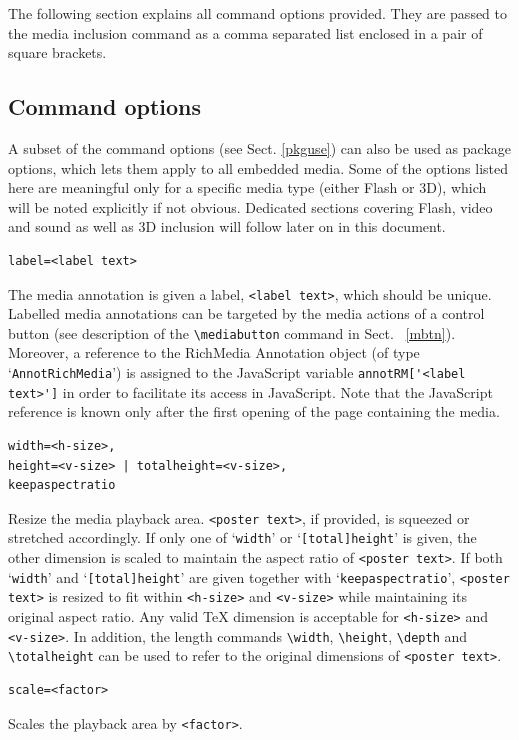 \documentclass[a4paper]{article}
\begin{document}
The following section explains all command options provided. They are passed to the media inclusion command as a comma separated list enclosed in a pair of square brackets.

\subsection{Command options}
A subset of the command options (see Sect. \ref{pkguse}) can also be used as package options, which lets them apply to all embedded media. Some of the options listed here are meaningful only for a specific media type (either Flash or 3D), which will be noted explicitly if not obvious. Dedicated sections covering Flash, video and sound as well as 3D inclusion will follow later on in this document.

\begin{verbatim}
label=<label text>
\end{verbatim}
The media annotation is given a label, \verb+<label text>+, which should be unique. Labelled media annotations can be targeted by the media actions of a control button (see description of the \verb+\mediabutton+ command in Sect. ~\ref{mbtn}). Moreover, a reference to the RichMedia Annotation object (of type `\verb+AnnotRichMedia+') is assigned to the JavaScript variable \verb+annotRM['<label text>']+ in order to facilitate its access in JavaScript. Note that the JavaScript reference is known only after the first opening of the page containing the media.
\begin{verbatim}
width=<h-size>,
height=<v-size> | totalheight=<v-size>,
keepaspectratio
\end{verbatim}
Resize the media playback area. \verb+<poster text>+, if provided, is squeezed or stretched accordingly. If only one of `\verb+width+' or `\verb+[total]height+' is given, the other dimension is scaled to maintain the aspect ratio of \verb+<poster text>+. If both `\verb+width+' and `\verb+[total]height+' are given together with `\verb+keepaspectratio+', \verb+<poster text>+ is resized to fit within \verb+<h-size>+ and \verb+<v-size>+ while maintaining its original aspect ratio. Any valid \TeX{} dimension is acceptable for \verb+<h-size>+ and \verb+<v-size>+. In addition, the length commands \verb+\width+, \verb+\height+, \verb+\depth+ and \verb+\totalheight+ can be used to refer to the original dimensions of \verb+<poster text>+.
\begin{verbatim}
scale=<factor>
\end{verbatim}
Scales the playback area by \verb+<factor>+.
\end{document}
